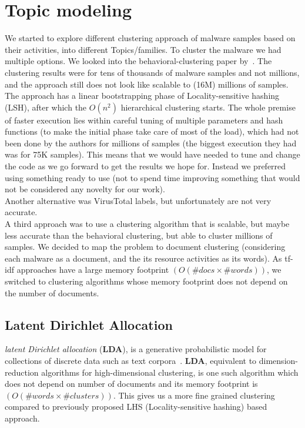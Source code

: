 \section{Topic modeling}
\label{sec:Topic model}
We started to explore different clustering approach of malware samples based on their activities, into different Topics/families.
To cluster the malware we had multiple options. We looked into the behavioral-clustering paper by~\cite[Bayer]{bayer}.
The clustering results were for tens of thousands of malware samples and not millions, and the approach still does not look like scalable to (16M) millions of samples.
The approach has a linear bootstrapping phase of Locality-sensitive hashing (LSH), after which the $O(n^2)$ hierarchical clustering starts.
The whole premise of faster execution lies within careful tuning of multiple parameters and hash functions (to make the initial phase take care of most of the load), which had not been done by the authors for millions of samples (the biggest execution they had was for 75K samples).
This means that we would have needed to tune and change the code as we go forward to get the results we hope for.
Instead we preferred using something ready to use (not to spend time improving something that would not be considered any novelty for our work).
\\
Another alternative was VirusTotal labels, but unfortunately are not very accurate.
\\
A third approach was to use a clustering algorithm that is scalable, but maybe less accurate than the behavioral clustering, but able to cluster millions of samples.
We decided to map the problem to document clustering (considering each malware as a document, and the its resource activities as its words).
As {tf-idf} approaches have a large memory footprint $(O(\#docs \times \#words))$, we switched to clustering algorithms whose memory footprint does not depend on the number of documents.
\\
\subsection{Latent Dirichlet Allocation}
\label{sub:LDA}
\textit{latent Dirichlet allocation} (\textbf{LDA}), is a generative probabilistic model for collections of discrete data such as text corpora~\cite[LDA]{Blei}.
\textbf{LDA}, equivalent to dimension-reduction algorithms for high-dimensional clustering, is one such algorithm which does not depend on number of documents and its memory footprint is $(O(\#words\times \#clusters))$.
This gives us a more fine grained clustering compared to previously proposed LHS (Locality-sensitive hashing) based approach.\\
